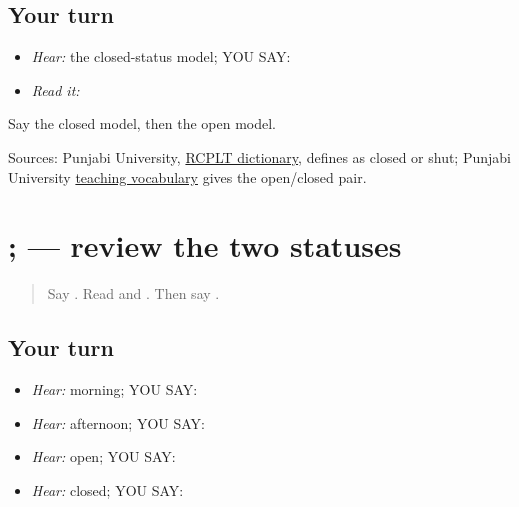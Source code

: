 \subsection*{Your turn}
\begin{itemize}
\raggedright
  \item \emph{Hear:} the closed-status model; YOU SAY: \textbf{  }
  \item \emph{Read it:} \textbf{  }
\end{itemize}

\begin{tcolorbox}[breakable,colback=teal!4,colframe=teal!35!black,title={Before you move on}]
Say the closed model, then the open model.

Sources: Punjabi University, \href{https://dic.learnpunjabi.org/default.aspx?look=\%E0\%A8\%AC\%E0\%A9\%B0\%E0\%A8\%A6}{RCPLT dictionary}, defines \textbf{} as closed or shut; Punjabi University \href{https://pnarang.weebly.com/uploads/1/4/5/6/14563640/vocab\_f.pdf}{teaching vocabulary} gives the open/closed pair.
\end{tcolorbox}
\section[\texorpdfstring{\pa{ਸਵੇਰੇ} \pa{ਖੁੱਲ੍ਹਾ}; \pa{ਦੁਪਹਿਰ} \pa{ਬੰਦ} (savere khullha …)}{ਸਵੇਰੇ ਖੁੱਲ੍ਹਾ; ਦੁਪਹਿਰ ਬੰਦ (savere khullha …)}]{ ;   — review the two statuses}

\label{lesson:PA-C179-status-review}



\begin{quote}
Say \textbf{}. Read \textbf{   } and \textbf{  }. Then say \textbf{  }.
\end{quote}

\subsection*{Your turn}
\begin{itemize}
\raggedright
  \item \emph{Hear:} morning; YOU SAY: \textbf{}
  \item \emph{Hear:} afternoon; YOU SAY: \textbf{}
  \item \emph{Hear:} open; YOU SAY: \textbf{}
  \item \emph{Hear:} closed; YOU SAY: \textbf{}
\end{itemize}

